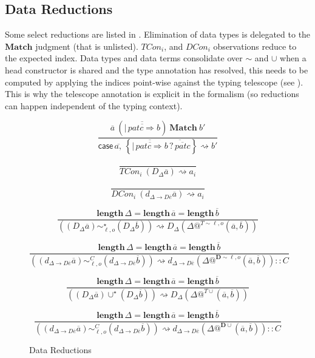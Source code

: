 \subsection{Data Reductions}

Some select reductions are listed in .
Elimination of data types is delegated to the $\mathbf{Match}$ judgment (that is unlisted).
$TCon_{i}$, and $DCon_{i}$ observations reduce to the expected index.
Data types and data terms consolidate over $\sim$ and $\cup$ when a head constructor is shared and the type annotation has resolved, this needs to be computed by applying the indices point-wise against the typing telescope (see ).
This is why the telescope annotation is explicit in the formalism (so reductions can happen independent of the typing context). 

\begin{figure}
\[
\frac{
  \overline{a}\ \left(\overline{|\,\overline{patc\Rightarrow}b}\right)\ \mathbf{Match}\ b'
}{
  \mathsf{case}\,\overline{a,}\,\left\{ \overline{|\,\overline{patc\Rightarrow}b}\, \overline{?\,\overline{patc}} \right\} \rightsquigarrow b'
}
\]

\[
\frac{\ }{TCon_{i}\ \left(D_{\Delta}\overline{a}\right)\rightsquigarrow a_{i}}
\]

\[
\frac{\ }{DCon_{i}\ \left(d_{\Delta\rightarrow D\overline{e}}\overline{a}\right)\rightsquigarrow a_{i}}
\]

\[
\frac{
  \mathbf{length}\,\Delta=\mathbf{length}\,\overline{a}=\mathbf{length}\,\overline{b}
}{
  \left(\left(D_{\Delta}\overline{a}\right)\sim_{\ell,o}^{\star}\left(D_{\Delta}\overline{b}\right)\right)\rightsquigarrow D_{\Delta}\left(\Delta@^{T\sim\ell,o}\left(\overline{a},\overline{b}\right)\right)}
\]

\[
\frac{
  \mathbf{length}\,\Delta=\mathbf{length}\,\overline{a}=\mathbf{length}\,\overline{b}
}{
  \left(\left(d_{\Delta\rightarrow D\overline{e}}\overline{a}\right)\sim_{\ell,o}^{C}\left(d_{\Delta\rightarrow D\overline{e}}\overline{b}\right)\right)\rightsquigarrow d_{\Delta\rightarrow D\overline{e}}\left(\Delta@^{\mathbf{D}\sim\ell,o}\left(\overline{a},\overline{b}\right)\right)::C}
\]

\[
\frac{
  \mathbf{length}\,\Delta=\mathbf{length}\,\overline{a}=\mathbf{length}\,\overline{b}
  }{\left(\left(D_{\Delta}\overline{a}\right)\cup^{\star}\left(D_{\Delta}\overline{b}\right)\right)\rightsquigarrow D_{\Delta}\left(\Delta@^{T\cup}\left(\overline{a},\overline{b}\right)\right)}
\]

\[
\frac{
  \mathbf{length}\,\Delta=\mathbf{length}\,\overline{a}=\mathbf{length}\,\overline{b}
}{
  \left(\left(d_{\Delta\rightarrow D\overline{e}}\overline{a}\right)\sim_{\ell,o}^{C}\left(d_{\Delta\rightarrow D\overline{e}}\overline{b}\right)\right)\rightsquigarrow d_{\Delta\rightarrow D\overline{e}}\left(\Delta@^{\mathbf{D}\cup}\left(\overline{a},\overline{b}\right)\right)::C}
\]
\caption{Data Reductions}
\label{fig:Data-Reductions}
\end{figure}



